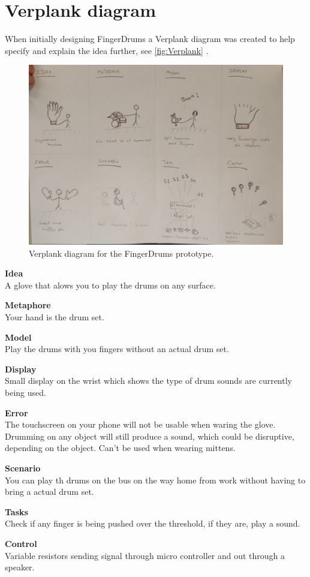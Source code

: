 \section{Verplank diagram}
\label{Verplank_diagram}
When initially designing FingerDrums a Verplank diagram was created to help specify and explain the idea further, see \autoref{fig:Verplank} . 
\blankline

\begin{figure}[H]
\centering
\includegraphics[scale = 0.1]{Figure/Billeder/IMG_20171114_121155.jpg}
\caption{Verplank diagram for the FingerDrums prototype.}
\label{fig:Verplank}
\end{figure}

\textbf{Idea}\\
A glove that alows you to play the drums on any surface.
\blankline

\textbf{Metaphore}\\
Your hand is the drum set.  
\blankline

\textbf{Model}\\
Play the drums with you fingers without an actual drum set.
\blankline

\textbf{Display}\\
Small display on the wrist which shows the type of drum sounds are currently being used.
\blankline

\textbf{Error}\\
The touchscreen on your phone will not be usable when waring the glove. Drumming on any object will still produce a sound, which could be disruptive, depending on the object. Can't be used when wearing mittens.
\blankline

\textbf{Scenario}\\
You can play th drums on the bus on the way home from work without having to bring a actual drum set.
\blankline

\textbf{Tasks}\\
Check if any finger is being pushed over the threshold, if they are, play a sound.
\blankline

\textbf{Control}\\
Variable resistors sending signal through micro controller and out through a speaker.